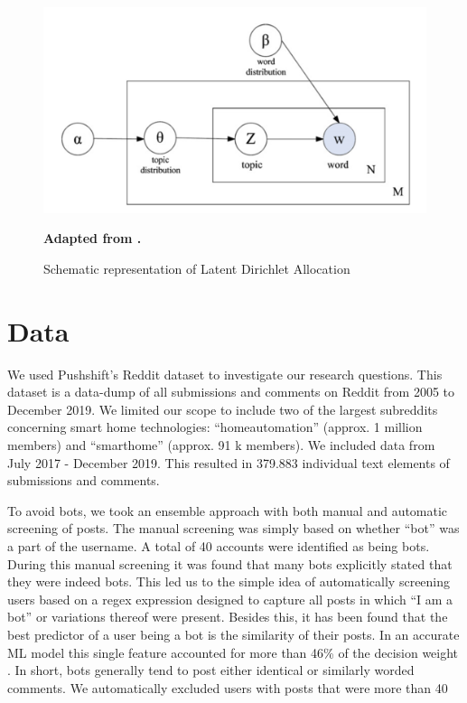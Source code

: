 \documentclass{article}
\begin{document}
\begin{figure}[H]
    \begin{centering}
    \includegraphics[scale=0.4]{../Figure/cao_juan.PNG}
    \caption{Schematic representation of Latent Dirichlet Allocation}
    \end{centering}
    \begin{footnotesize} 
        \begin{center}
            \textbf{Adapted from .}
        \end{center}
    \end{footnotesize}
\end{figure}

    \section{Data}
    We used Pushshift’s Reddit dataset \cite{baumgartner2020pushshift} to investigate our research questions. This dataset is a data-dump of all submissions and comments on Reddit from 2005 to December 2019. We limited our scope to include two of the largest subreddits concerning smart home technologies: “homeautomation” (approx. 1 million members) and “smarthome” (approx. 91 k members). We included data from July 2017 - December 2019. This resulted in 379.883 individual text elements of submissions and comments. 

To avoid bots, we took an ensemble approach with both manual and automatic screening of posts. The manual screening was simply based on whether “bot” was a part of the username. A total of 40 accounts were identified as being bots. During this manual screening it was found that many bots explicitly stated that they were indeed bots. This led us to the simple idea of automatically screening users based on a regex expression designed to capture all posts in which “I am a bot” or variations thereof were present. Besides this, it has been found \cite{skowronski_identifying_2019} that the best predictor of a user being a bot is the similarity of their posts. In an accurate ML model this single feature accounted for more than 46\% of the decision weight \cite{skowronski_identifying_2019}. In short, bots generally tend to post either identical or similarly worded comments. We automatically excluded users with posts that were more than 40%
\end{document}
